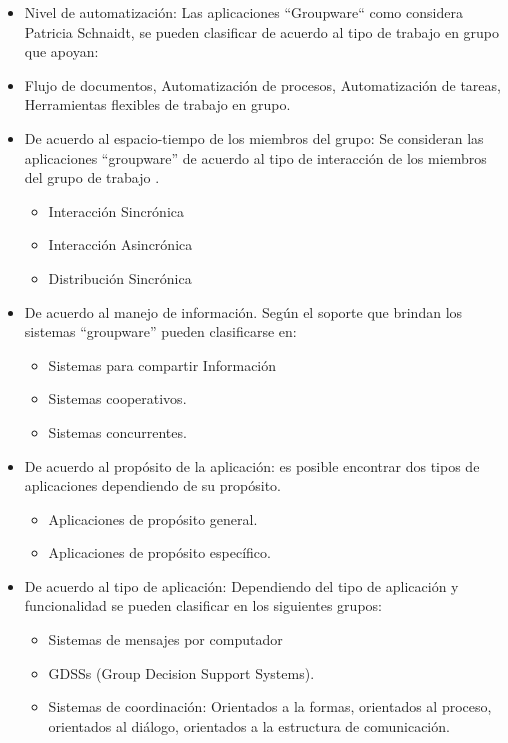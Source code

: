 \begin{itemize}

\item  Nivel de automatización: Las aplicaciones ``Groupware`` como considera
Patricia Schnaidt, se pueden clasificar de acuerdo al tipo de trabajo en grupo
que apoyan: \cite{cap1.1.groupware}

\item  {Flujo de documentos, Automatización de procesos, Automatización de
tareas, Herramientas flexibles de trabajo en grupo.}


\item De acuerdo al espacio-tiempo de los miembros del grupo: Se consideran las
aplicaciones “groupware” de acuerdo al tipo de interacción de los miembros del
grupo de trabajo \cite{cap1.4.groupware}.

\begin{itemize}
\item Interacción Sincrónica
\item Interacción Asincrónica
\item Distribución Sincrónica
\end{itemize}

\item De acuerdo al manejo de información. Según el soporte que brindan
\cite{cap1.5.groupware} los sistemas “groupware” pueden clasificarse en:
\begin{itemize}
 \item Sistemas para compartir Información
 \item Sistemas cooperativos.
 \item Sistemas concurrentes.
\end{itemize}

\item De acuerdo al propósito de la aplicación: es posible encontrar dos tipos de
aplicaciones dependiendo de su propósito.
\begin{itemize}
 \item Aplicaciones de propósito general.
 \item Aplicaciones de propósito específico.
\end{itemize}

\item De acuerdo al tipo de aplicación: Dependiendo del tipo de aplicación
y funcionalidad se pueden clasificar en los siguientes grupos:

\begin{itemize}
 \item Sistemas de mensajes por computador
 \item GDSSs (Group Decision Support Systems).
 \item Sistemas de coordinación: Orientados a la formas, orientados al proceso,
orientados al diálogo, orientados a la estructura de comunicación.	
\end{itemize}


\end{itemize}
